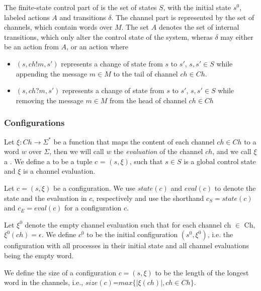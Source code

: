 The finite-state control part of  is the set of states $S$, with the initial state $s^0$, labeled actions $A$ and transitions $\delta$. The channel part is represented by the set  of channels, which contain words over $M$. The set $A$ denotes the set of internal transitions, which only alter the control state of the system, wheras $\delta$ may either be an action from $A$, or an action where

\begin{itemize}
\item[]
$(s, ch!m, s')$ represents a change of state from $s$ to $s'$,  $s, s' \in S$ while appending the message $m\in M$ to the tail of channel $ch\in Ch$.
\item[]
$(s, ch?m, s')$ represents a change of state from $s$ to $s'$, $s, s' \in S$ while removing the message $m\in M$ from the head of channel $ch \in Ch$
\end{itemize}



\subsubsection{Configurations}
Let $\xi : Ch \rightarrow \Sigma^*$ be a function that maps the content of each channel $ch \in Ch$ to a word $w$ over $\Sigma$, then we will call $w$ the \emph{evaluation} of the channel $ch$, and we call $\xi$ a . We define a  to be a tuple $c$ = $(s, \xi)$, such that $s \in S$ is a global control state and $\xi$ is a channel evaluation.

Let $c=(s,\xi)$ be a configuration. We use $state(c)$ and $eval(c)$  to denote the state and the evaluation in $c$, respectively and use the shorthand $c_{S} = state(c)$ and $c_{E} = eval(c)$ for a configuration $c$.

Let $\xi^0$ denote the empty channel evaluation such that for each channel ch $\in$ Ch, $\xi^0(ch)=\epsilon$. We define $c^0$ to be the initial configuration $(s^0, \xi^0)$, i.e. the configuration with all processes in their initial state and all channel evaluations being the empty word.

We define the size of a configuration $c = (s,\xi)$ to be the length of the longest word in the channels, i.e., $size(c)$=$max\{|\xi(ch)|, ch \in Ch\}$.

